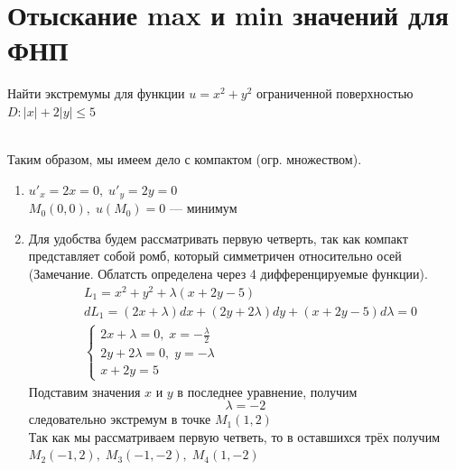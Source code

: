 \author{Andrei Tkachuk}

\section{Отыскание max и min значений для ФНП}

\begin{Example}
    Найти экстремумы для функции $u = x^2 + y^2$ ограниченной поверхностью $D: |x|+2|y| \leqslant 5$
    \begin{figure}[h!]
        \noindent{}
    \end{figure}\\
    Таким образом, мы имеем дело с компактом (огр. множеством).
    \begin{enumerate}
        \item $u'_x = 2x = 0, \; u'_y = 2y = 0$\\
              $M_0(0, 0), \; u(M_0) = 0$ --- минимум
        \item Для удобства будем рассматривать первую четверть, так как компакт представляет собой ромб, который симметричен относительно осей (Замечание. Облатсть определена через 4 дифференцируемые функции).
        \begin{align*}
            &L_1 = x^2 + y^2 + \lambda(x + 2y - 5)\\
            &dL_1 = (2x + \lambda)dx + (2y + 2\lambda)dy + (x + 2y - 5)d\lambda = 0\\
            &\begin{cases}
                2x + \lambda = 0, \; x = -\frac{\lambda}{2}\\
                2y + 2\lambda = 0, \; y = -\lambda\\
                x + 2y = 5
            \end{cases}
        \end{align*}
        Подставим значения $x$ и $y$ в последнее уравнение, получим
        \[
            \lambda = -2
        \]
        следовательно экстремум в точке $M_1(1, 2)$\\
        Так как мы рассматриваем первую четветь, то в оставшихся трёх получим $M_2(-1, 2), \; M_3(-1, -2), \; M_4(1, -2)$\\

\end{enumerate}
\end{Example}
